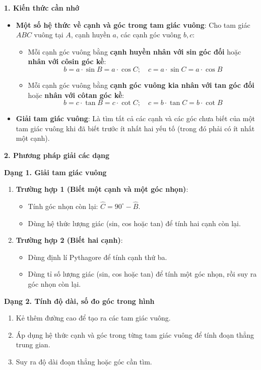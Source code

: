 \textbf{1. Kiến thức cần nhớ}
\begin{itemize}
\item \textbf{Một số hệ thức về cạnh và góc trong tam giác vuông}:
Cho tam giác $ABC$ vuông tại $A$, cạnh huyền $a$, các cạnh góc vuông $b, c$:
\begin{itemize}
\item Mỗi cạnh góc vuông bằng \textbf{cạnh huyền nhân với sin góc đối} hoặc \textbf{nhân với côsin góc kề}:
$$\boxed{b = a \cdot \sin B = a \cdot \cos C};\quad \boxed{c = a \cdot \sin C = a \cdot \cos B}$$
\item Mỗi cạnh góc vuông bằng \textbf{cạnh góc vuông kia nhân với tan góc đối} hoặc \textbf{nhân với côtan góc kề}:
$$\boxed{b = c \cdot \tan B = c \cdot \cot C};\quad \boxed{c = b \cdot \tan C = b \cdot \cot B}$$
\end{itemize}
\item \textbf{Giải tam giác vuông}: Là tìm tất cả các cạnh và các góc chưa biết của một tam giác vuông khi đã biết trước ít nhất hai yếu tố (trong đó phải có ít nhất một cạnh).
\end{itemize}

\textbf{2. Phương pháp giải các dạng}

\textbf{Dạng 1. Giải tam giác vuông}
\begin{enumerate}
\item \textbf{Trường hợp 1 (Biết một cạnh và một góc nhọn)}:
\begin{itemize}
\item Tính góc nhọn còn lại: $\widehat{C} = 90^\circ - \widehat{B}$.
\item Dùng hệ thức lượng giác (sin, cos hoặc tan) để tính hai cạnh còn lại.
\end{itemize}
\item \textbf{Trường hợp 2 (Biết hai cạnh)}:
\begin{itemize}
\item Dùng định lí Pythagore để tính cạnh thứ ba.
\item Dùng tỉ số lượng giác (sin, cos hoặc tan) để tính một góc nhọn, rồi suy ra góc nhọn còn lại.
\end{itemize}
\end{enumerate}

\textbf{Dạng 2. Tính độ dài, số đo góc trong hình}
\begin{enumerate}
\item Kẻ thêm đường cao để tạo ra các tam giác vuông.
\item Áp dụng hệ thức cạnh và góc trong từng tam giác vuông để tính đoạn thẳng trung gian.
\item Suy ra độ dài đoạn thẳng hoặc góc cần tìm.
\end{enumerate}

